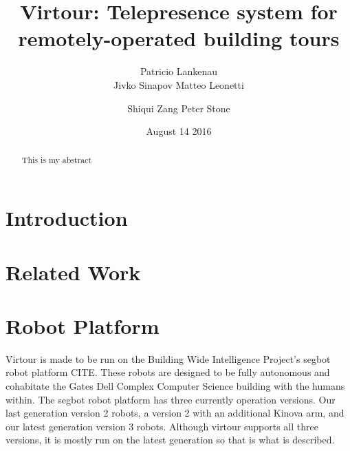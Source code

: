 \documentclass{sig-alternate-05-2015}
\begin{document}
\doi{}

\isbn{}



%

\title{Virtour: Telepresence system for remotely-operated building tours}

\author{
\alignauthor
Patricio Lankenau\\
\alignauthor
Jivko Sinapov
\alignauthor
Matteo Leonetti
\and 
\alignauthor
Shiqui Zang
\alignauthor
Peter Stone
}
\date{August 14 2016}

\maketitle
\begin{abstract}
  This is my abstract
\end{abstract}


\section{Introduction}

\section{Related Work}

\section{Robot Platform}

Virtour is made to be run on the Building Wide Intelligence Project's segbot
robot platform {CITE}. These robots are designed to be fully autonomous and
cohabitate the Gates Dell Complex Computer Science building with the humans
within. The segbot robot platform has three currently operation versions. Our
last generation version 2 robots, a version 2 with an additional Kinova arm,
and our latest generation version 3 robots. Although virtour supports all three
versions, it is mostly run on the latest generation so that is what is
described.
\end{document}
